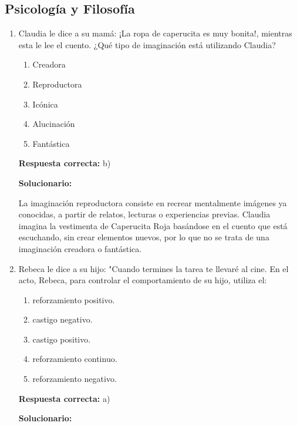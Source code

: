 \subsection*{Psicología y Filosofía}

\begin{enumerate}[resume]

	\item Claudia le dice a su mamá: ¡La ropa de caperucita es muy bonita!, mientras esta le lee el cuento.
	¿Qué tipo de imaginación está utilizando Claudia?

	\begin{enumerate}[label=\alph*)]
		\item Creadora
		\item Reproductora
		\item Icónica
		\item Alucinación
		\item Fantástica
	\end{enumerate}

	\textbf{Respuesta correcta:} b)

      \vspace{2mm}
      \textbf{Solucionario:}

      La imaginación reproductora consiste en recrear mentalmente imágenes ya conocidas, a partir de relatos, lecturas o experiencias previas.
      Claudia imagina la vestimenta de Caperucita Roja basándose en el cuento que está escuchando, sin crear elementos nuevos, por lo que no se trata de una imaginación creadora o fantástica.

	\vspace{6mm}

	\item Rebeca le dice a su hijo: "Cuando termines la tarea te llevaré al cine. En el acto, Rebeca, para controlar el comportamiento de su hijo, utiliza el:
	\begin{enumerate}[label=\alph*)]
		\item reforzamiento positivo.
		\item castigo negativo.
		\item castigo positivo.
		\item reforzamiento continuo.
		\item reforzamiento negativo.
	\end{enumerate}

	\textbf{Respuesta correcta:} a)


	\vspace{2mm}
	\textbf{Solucionario:}


\end{enumerate}
